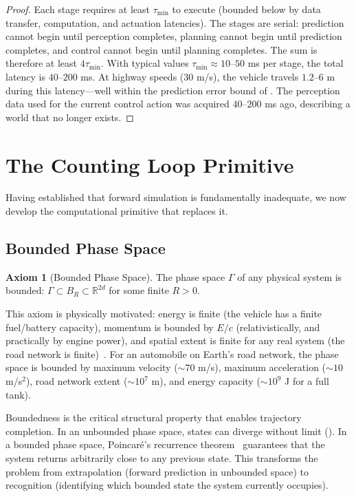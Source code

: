 \documentclass[twocolumn,10pt]{article}
\theoremstyle{definition}
\newtheorem{axiom}[theorem]{Axiom}
\begin{document}
\begin{proof}
Each stage requires at least $\tau_{\min}$ to execute (bounded below by data transfer, computation, and actuation latencies). The stages are serial: prediction cannot begin until perception completes, planning cannot begin until prediction completes, and control cannot begin until planning completes. The sum is therefore at least $4\tau_{\min}$. With typical values $\tau_{\min} \approx 10$--$50$ ms per stage, the total latency is $40$--$200$ ms. At highway speeds ($30$ m/s), the vehicle travels $1.2$--$6$ m during this latency---well within the prediction error bound of . The perception data used for the current control action was acquired $40$--$200$ ms ago, describing a world that no longer exists.
\end{proof}


\section{The Counting Loop Primitive}
\label{sec:counting-loop}

Having established that forward simulation is fundamentally inadequate, we now develop the computational primitive that replaces it.

\subsection{Bounded Phase Space}

\begin{axiom}[Bounded Phase Space]
\label{ax:bounded}
The phase space $\Gamma$ of any physical system is bounded: $\Gamma \subset B_R \subset \mathbb{R}^{2d}$ for some finite $R > 0$.
\end{axiom}

This axiom is physically motivated: energy is finite (the vehicle has a finite fuel/battery capacity), momentum is bounded by $E/c$ (relativistically, and practically by engine power), and spatial extent is finite for any real system (the road network is finite)~\cite{arnold1978}. For an automobile on Earth's road network, the phase space is bounded by maximum velocity ($\sim 70$ m/s), maximum acceleration ($\sim 10$ m/s$^2$), road network extent ($\sim 10^7$ m), and energy capacity ($\sim 10^9$ J for a full tank).

Boundedness is the critical structural property that enables trajectory completion. In an unbounded phase space, states can diverge without limit (). In a bounded phase space, Poincar\'{e}'s recurrence theorem~\cite{poincare1890} guarantees that the system returns arbitrarily close to any previous state. This transforms the problem from extrapolation (forward prediction in unbounded space) to recognition (identifying which bounded state the system currently occupies).
\end{document}
